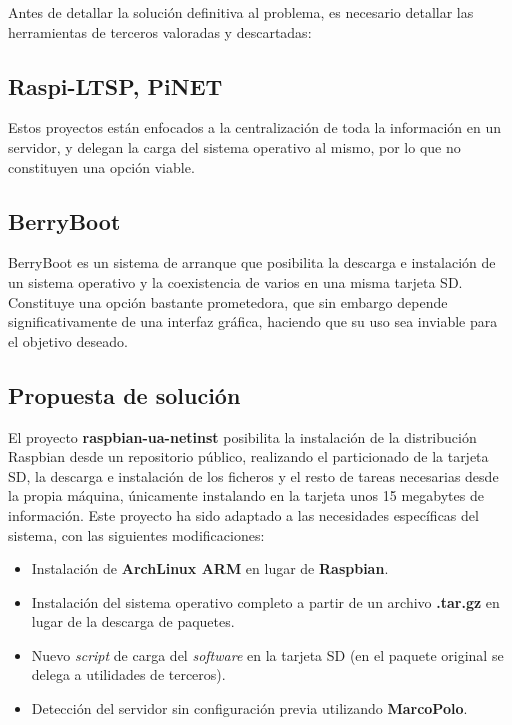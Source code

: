 \documentclass{article}
\begin{document}
Antes de detallar la solución definitiva al problema, es necesario detallar las herramientas de terceros valoradas y descartadas:

\subsection*{Raspi-LTSP, PiNET}

Estos proyectos\cite{raspiltsp, pinet} están enfocados a la centralización de toda la información en un servidor, y delegan la carga del sistema operativo al mismo, por lo que no constituyen una opción viable.

\subsection*{BerryBoot}

BerryBoot\cite{berryboot} es un sistema de arranque que posibilita la descarga e instalación de un sistema operativo y la coexistencia de varios en una misma tarjeta SD. Constituye una opción bastante prometedora, que sin embargo depende significativamente de una interfaz gráfica, haciendo que su uso sea inviable para el objetivo deseado.

\subsection{Propuesta de solución}

El proyecto \textbf{raspbian-ua-netinst}\cite{raspbian-ua-netinst} posibilita la instalación de la distribución Raspbian desde un repositorio público, realizando el particionado de la tarjeta SD, la descarga e instalación de los ficheros y el resto de tareas necesarias desde la propia máquina, únicamente instalando en la tarjeta unos 15 megabytes de información. Este proyecto ha sido adaptado a las necesidades específicas del sistema, con las siguientes modificaciones:

\begin{itemize}
	\item Instalación de \textbf{ArchLinux ARM} en lugar de \textbf{Raspbian}.
	\item Instalación del sistema operativo completo a partir de un archivo \textbf{.tar.gz} en lugar de la descarga de paquetes.
	\item Nuevo \textit{script} de carga del \textit{software} en la tarjeta SD (en el paquete original se delega a utilidades de terceros).
	\item Detección del servidor sin configuración previa utilizando \textbf{MarcoPolo}.
\end{itemize}
\end{document}
